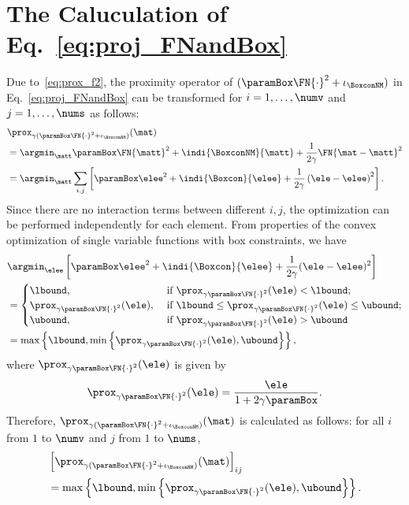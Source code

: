 \documentclass[journal]{IEEEtran}
\begin{document}
\section{The Caluculation of Eq.~\texorpdfstring{\eqref{eq:proj_FNandBox}}{(46)}}
\label{appendix:calc_FNandBox}
Due to~\eqref{eq:prox_f2}, the proximity operator of $(\paramBox \FN{\cdot}^2 + \iota_{\BoxconNM})$ in Eq.~\eqref{eq:proj_FNandBox} can be transformed for $i = 1, \dots, \numv$ and $j = 1, \dots, \nums$ as follows:
\begin{align}
    \label{eq:proof_FNandBox_1}
    &\prox_{\gamma(\paramBox \FN{\cdot}^2 + \iota_{\BoxconNM})} (\mat) \nonumber \\ 
    &= \argmin_{\matt} \paramBox \FN{\matt}^{2} + \indi{\BoxconNM}{\matt} + \frac{1}{2\gamma} \FN{\mat - \matt}^{2} \nonumber \\
    &= \argmin_{\matt} \sum_{i,j} \left[ \paramBox \elee^{2} + \indi{\Boxcon}{\elee} + \frac{1}{2\gamma} \left(\ele - \elee \right)^{2} \right].
\end{align}
Since there are no interaction terms between different $i, j$, the optimization can be performed independently for each element.
From properties of the convex optimization of single variable functions with box constraints, we have
\begin{align}
    \label{eq:proof_FNandBox_3}
    &\argmin_{\elee} \left[ \paramBox \elee^{2} + \indi{\Boxcon}{\elee} + \frac{1}{2\gamma} (\ele - \elee)^{2} \right] \\
    &= 
    \begin{cases}
        \lbound, \ &\mbox{if} \ \prox_{\gamma \paramBox \FN{\cdot}^2} (\ele) < \lbound; \\
        \prox_{\gamma \paramBox \FN{\cdot}^2} (\ele), \ &\mbox{if} \ \lbound \leq \prox_{\gamma \paramBox \FN{\cdot}^2} (\ele) \leq \ubound; \\
        \ubound, \ &\mbox{if} \ \prox_{\gamma \paramBox \FN{\cdot}^2} (\ele) > \ubound
    \end{cases} \nonumber \\
    &= \max \left\{ \lbound, \min \left\{ \prox_{\gamma \paramBox \FN{\cdot}^2} (\ele), \ubound \right\} \right\},
\end{align}
where $\prox_{\gamma \paramBox \FN{\cdot}^2} (\ele)$ is given by
\begin{align}
    \label{eq:proof_FNandBox_2}
    \prox_{\gamma \paramBox \FN{\cdot}^2} (\ele) = \frac{\ele}{1 + 2 \gamma \paramBox}.
\end{align}
Therefore, $\prox_{\gamma( \paramBox \FN{\cdot}^2 + \iota_{\BoxconNM})} (\mat)$ is calculated as follows: for all $i$ from $1$ to $\numv$ and $j$ from $1$ to $\nums$,
\begin{align}
    \label{eq:proof_FNandBox_4}
    &\left[\prox_{\gamma( \paramBox \FN{\cdot}^2 + \iota_{\BoxconNM})} (\mat)\right]_{ij} \nonumber \\
    &= \max \left\{ \lbound, \min \left\{ \prox_{\gamma \paramBox \FN{\cdot}^2} (\ele), \ubound \right\} \right\}.
\end{align}
\end{document}

